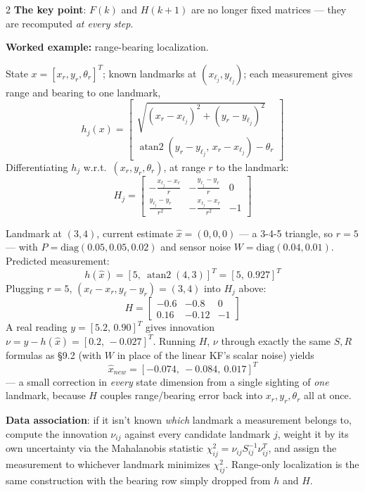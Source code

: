 \documentclass[10pt,a4paper]{article}
\newcommand{\keyterm}[1]{\textbf{#1}}
\begin{document}
\begin{multicols}{2}
\keyterm{The key point}: $F(k)$ and $H(k{+}1)$ are no longer fixed matrices --- they are recomputed \emph{at every step}.

\keyterm{Worked example:} range-bearing localization.

State $x=[x_r,y_r,\theta_r]^T$; known landmarks at $(x_{\ell_j},y_{\ell_j})$; each measurement gives range and bearing to one landmark,
\[
h_j(x)=\begin{bmatrix}\sqrt{(x_r-x_{\ell_j})^2+(y_r-y_{\ell_j})^2}\\[2pt] \operatorname{atan2}(y_r-y_{\ell_j},\,x_r-x_{\ell_j})-\theta_r\end{bmatrix}
\]
Differentiating $h_j$ w.r.t.\ $(x_r,y_r,\theta_r)$, at range $r$ to the landmark:
\[
H_j=\begin{bmatrix}-\tfrac{x_{\ell_j}-x_r}{r} & -\tfrac{y_{\ell_j}-y_r}{r} & 0\\[4pt] \tfrac{y_{\ell_j}-y_r}{r^2} & -\tfrac{x_{\ell_j}-x_r}{r^2} & -1\end{bmatrix}
\]

Landmark at $(3,4)$, current estimate $\hat x=(0,0,0)$ --- a 3-4-5 triangle, so $r=5$ --- with $P=\mathrm{diag}(0.05,0.05,0.02)$ and sensor noise $W=\mathrm{diag}(0.04,0.01)$. Predicted measurement:
\[
h(\hat x)=[5,\ \operatorname{atan2}(4,3)]^T=[5,\ 0.927]^T
\]
Plugging $r=5$, $(x_\ell{-}x_r,y_\ell{-}y_r)=(3,4)$ into $H_j$ above:
\[
H=\begin{bmatrix}-0.6&-0.8&0\\0.16&-0.12&-1\end{bmatrix}
\]
A real reading $y=[5.2,\,0.90]^T$ gives innovation $\nu=y-h(\hat x)=[0.2,\,{-}0.027]^T$. Running $H$, $\nu$ through exactly the same $S,R$ formulas as \S9.2 (with $W$ in place of the linear KF's scalar noise) yields
\[
\hat x_{new}=[{-}0.074,\ {-}0.084,\ 0.017]^T
\]
--- a small correction in \emph{every} state dimension from a single sighting of \emph{one} landmark, because $H$ couples range/bearing error back into $x_r,y_r,\theta_r$ all at once.

\begin{notebox}
\keyterm{Data association}: if it isn't known \emph{which} landmark a measurement belongs to, compute the innovation $\nu_{ij}$ against every candidate landmark $j$, weight it by its own uncertainty via the Mahalanobis statistic $\chi^2_{ij}=\nu_{ij}S_{ij}^{-1}\nu_{ij}^T$, and assign the measurement to whichever landmark minimizes $\chi^2_{ij}$. Range-only localization is the same construction with the bearing row simply dropped from $h$ and $H$.
\end{notebox}


\end{multicols}
\end{document}

